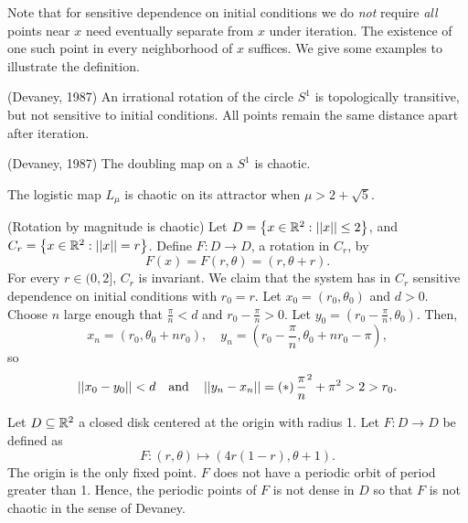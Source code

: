 \documentclass[12pt,draft,twoside]{book}
\begin{document}
\noindent Note that for sensitive dependence on initial conditions we do \textit{not} require \textit{all} points near $x$ need eventually separate from $x$ under iteration.
The existence of one such point in every neighborhood of $x$ suffices.
We give some examples to illustrate the definition.
\begin{example}
  (Devaney, 1987)
  An irrational rotation of the circle $S^1$ is topologically transitive, but not sensitive to initial conditions.
  All points remain the same distance apart after iteration.
\end{example}
\begin{example}
  (Devaney, 1987)
  The doubling map on a $S^1$ is chaotic.
\end{example}
\begin{example}
  The logistic map $L_\mu$ is chaotic on its attractor when $\mu > 2 + \sqrt{5}$.
\end{example}
\begin{example}
  (Rotation by magnitude is chaotic)
  Let $D = \left \{ x \in \mathbb{R}^2: \left|\left| x \right|\right| \leq 2 \right \}$, and $C_r = \left \{ x \in \mathbb{R}^2: \left|\left| x \right|\right| = r \right \}$.
  Define $F: D \to D$, a rotation in $C_r$, by
  \begin{equation*}
    F(x) = F(r, \theta) = (r, \theta + r).
  \end{equation*}
  For every $r \in (0,2]$, $C_r$ is invariant.
  We claim that the system has in $C_r$ sensitive dependence on initial conditions with $r_0 = r$.
  Let $x_0 = (r_0, \theta_0)$ and $d > 0$.
  Choose $n$ large enough that $\frac{\pi}{n} < d$ and $r_0 - \frac{\pi}{n} > 0$.
  Let $y_0 = (r_0 - \frac{\pi}{n}, \theta_0)$.
  Then,
  \begin{equation*}
    x_n = (r_0, \theta_0 + nr_0),\quad
    y_n = (r_0 - \frac{\pi}{n}, \theta_0 + nr_0 - \pi),
  \end{equation*}
  so
  \begin{equation*}
    \left|\left| x_0 - y_0 \right|\right| < d \quad\mbox{and}\quad \left|\left| y_n - x_n \right|\right| = \left ( * \right ){\frac{\pi}{n}}^2 + \pi^2 > 2 > r_0.
  \end{equation*}
\end{example}

\begin{example}
  Let $D \subseteq \mathbb{R}^2$ a closed disk centered at the origin with radius 1.
  Let $F: D \to D$ be defined as
  \begin{equation*}
    F: (r, \theta) \mapsto (4r(1 - r), \theta + 1).
  \end{equation*}
  The origin is the only fixed point.
  $F$ does not have a periodic orbit of period greater than 1.
  Hence, the periodic points of $F$ is not dense in $D$ so that $F$ is not chaotic in the sense of Devaney.
\end{example}
\end{document}
